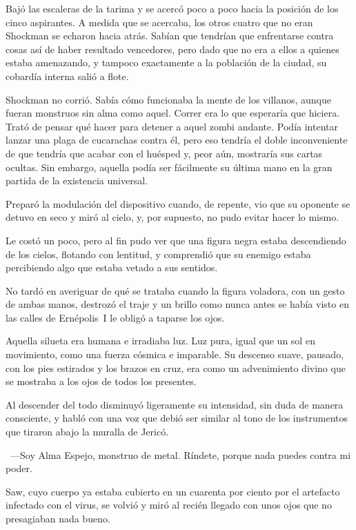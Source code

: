 Bajó las escaleras de la tarima y se acercó poco a poco hacia la posición de los cinco aspirantes. A medida que se acercaba, los otros cuatro que no eran Shockman se echaron hacia atrás. Sabían que tendrían que enfrentarse contra cosas así de haber resultado vencedores, pero dado que no era a ellos a quienes estaba amenazando, y tampoco exactamente a la población de la ciudad, su cobardía interna salió a flote.

Shockman no corrió. Sabía cómo funcionaba la mente de los villanos, aunque fueran monstruos sin alma como aquel. Correr era lo que esperaría que hiciera. Trató de pensar qué hacer para detener a aquel zombi andante. Podía intentar lanzar una plaga de cucarachas contra él, pero eso tendría el doble inconveniente de que tendría que acabar con el huésped y, peor aún, mostraría sus cartas ocultas. Sin embargo, aquella podía ser fácilmente su última mano en la gran partida de la existencia universal.

Preparó la modulación del dispositivo cuando, de repente, vio que su oponente se detuvo en seco y miró al cielo, y, por supuesto, no pudo evitar hacer lo mismo.

Le costó un poco, pero al fin pudo ver que una figura negra estaba descendiendo de los cielos, flotando con lentitud, y comprendió que su enemigo estaba percibiendo algo que estaba vetado a sus sentidos.

No tardó en averiguar de qué se trataba cuando la figura voladora, con un gesto de ambas manos, destrozó el traje y un brillo como nunca antes se había visto en las calles de Ernépolis~I le obligó a taparse los ojos.

Aquella silueta era humana e irradiaba luz. Luz pura, igual que un sol en movimiento, como una fuerza cósmica e imparable. Su descenso suave, pausado, con los pies estirados y los brazos en cruz, era como un advenimiento divino que se mostraba a los ojos de todos los presentes.

Al descender del todo disminuyó ligeramente su intensidad, sin duda de manera consciente, y habló con una voz que debió ser similar al tono de los instrumentos que tiraron abajo la muralla de Jericó.

~---Soy Alma Espejo, monstruo de metal. Ríndete, porque nada puedes contra mi poder.

Saw, cuyo cuerpo ya estaba cubierto en un cuarenta por ciento por el artefacto infectado con el virus, se volvió y miró al recién llegado con unos ojos que no presagiaban nada bueno.

